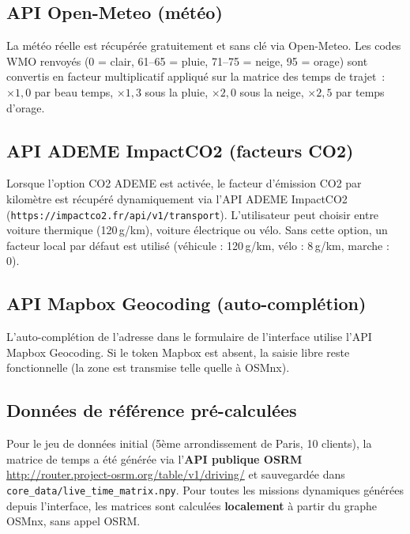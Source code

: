 \documentclass[a4paper, 12pt, twoside]{article}
\begin{document}
\subsection{API Open-Meteo (m\'{e}t\'{e}o)}

La m\'{e}t\'{e}o r\'{e}elle est r\'{e}cup\'{e}r\'{e}e gratuitement et sans cl\'{e} via Open-Meteo.
Les codes WMO renvoy\'{e}s (0 = clair, 61--65 = pluie, 71--75 = neige, 95 = orage) sont convertis
en facteur multiplicatif appliqu\'{e} sur la matrice des temps de trajet~: $\times 1{,}0$ par
beau temps, $\times 1{,}3$ sous la pluie, $\times 2{,}0$ sous la neige, $\times 2{,}5$ par
temps d'orage.

\subsection{API ADEME ImpactCO2 (facteurs CO2)}

Lorsque l'option \og CO2 ADEME \fg{} est activ\'{e}e, le facteur d'\'{e}mission CO2 par
kilom\`{e}tre est r\'{e}cup\'{e}r\'{e} dynamiquement via l'API ADEME ImpactCO2
(\texttt{https://impactco2.fr/api/v1/transport}). L'utilisateur peut choisir entre voiture
thermique (120\,g/km), voiture \'{e}lectrique ou v\'{e}lo. Sans cette option, un facteur
local par d\'{e}faut est utilis\'{e} (v\'{e}hicule : 120\,g/km, v\'{e}lo : 8\,g/km, marche : 0).

\subsection{API Mapbox Geocoding (auto-compl\'{e}tion)}

L'auto-compl\'{e}tion de l'adresse dans le formulaire de l'interface utilise l'API
Mapbox Geocoding. Si le token Mapbox est absent, la saisie libre reste fonctionnelle
(la zone est transmise telle quelle \`{a} OSMnx).

\subsection{Donn\'{e}es de r\'{e}f\'{e}rence pr\'{e}-calcul\'{e}es}

Pour le jeu de donn\'{e}es initial (5\`{e}me arrondissement de Paris, 10 clients), la matrice
de temps a \'{e}t\'{e} g\'{e}n\'{e}r\'{e}e via l'\textbf{API publique OSRM}
\url{http://router.project-osrm.org/table/v1/driving/} et sauvegard\'{e}e dans
\texttt{core\_data/live\_time\_matrix.npy}. Pour toutes les missions dynamiques g\'{e}n\'{e}r\'{e}es
depuis l'interface, les matrices sont calcul\'{e}es \textbf{localement} \`{a} partir du graphe OSMnx,
sans appel OSRM.
\end{document}
